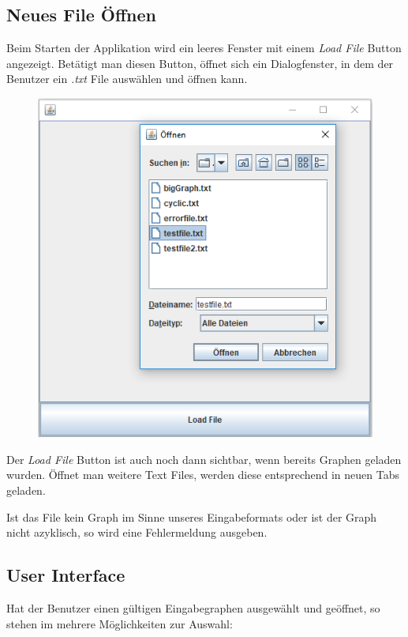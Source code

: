 
\subsection*{Neues File Öffnen}
Beim Starten der Applikation wird ein leeres Fenster mit einem \textit{Load File} Button angezeigt. Betätigt man diesen Button, öffnet sich ein Dialogfenster, in dem der Benutzer ein \textit{.txt} File auswählen und öffnen kann. 

\begin{figure}[h!]
    \centering
    \includegraphics[width=.4\textwidth]{images/loadFile.png}
\end{figure}

Der \textit{Load File} Button ist auch noch dann sichtbar, wenn bereits Graphen geladen wurden. Öffnet man weitere Text Files, werden diese entsprechend in neuen Tabs geladen.

Ist das File kein Graph im Sinne unseres Eingabeformats oder ist der Graph nicht azyklisch, so wird eine Fehlermeldung ausgeben.

\subsection*{User Interface}

Hat der Benutzer einen gültigen Eingabegraphen ausgewählt und geöffnet, so stehen im mehrere Möglichkeiten zur Auswahl:

